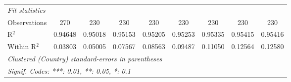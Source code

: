 \begin{table}[htbp]
\begin{tabular}{lcccccccc}
      \midrule
      \emph{Fit statistics}\\
      Observations                            & 270             & 230            & 230      & 230           & 230           & 230           & 230            & 230\\  
      R$^2$                                   & 0.94648         & 0.95018        & 0.95153  & 0.95205       & 0.95253       & 0.95335       & 0.95415        & 0.95416\\  
      Within R$^2$                            & 0.03803         & 0.05005        & 0.07567  & 0.08563       & 0.09487       & 0.11050       & 0.12564        & 0.12580\\  
      \midrule \midrule
      \multicolumn{9}{l}{\emph{Clustered (Country) standard-errors in parentheses}}\\
      \multicolumn{9}{l}{\emph{Signif. Codes: ***: 0.01, **: 0.05, *: 0.1}}\\
   \end{tabular}
\end{table}


